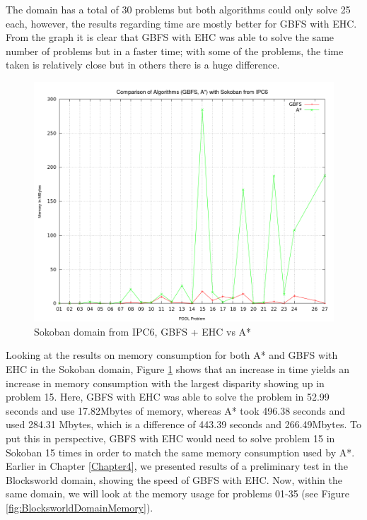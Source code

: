 The domain has a total of 30 problems but both algorithms could only solve 25 each, however, the results regarding time are mostly better for GBFS with EHC.  From the graph it is clear that GBFS with EHC was able to solve the same number of problems but in a faster time; with some of the problems, the time taken is relatively close but in others there is a huge difference.    
\\
\begin{figure}[!htb]
    \centering
    \includegraphics[scale=0.35]{SokobanMemory.png}
    \caption{Sokoban domain from IPC6, GBFS + EHC vs A* }
    \label{fig:SokobanDomainMemory}
\end{figure} 
Looking at the results on memory consumption for both A* and GBFS with EHC in the Sokoban domain, Figure \ref{fig:SokobanDomainMemory} shows that an increase in time yields an increase in memory consumption with the largest disparity showing up in problem 15. Here, GBFS with EHC was able to solve the problem in 52.99 seconds and use 17.82Mbytes of memory, whereas A* took 496.38 seconds and used 284.31 Mbytes, which is a difference of 443.39 seconds and 266.49Mbytes. To put this in perspective, GBFS with EHC would need to solve problem 15 in Sokoban 15 times in order to match the same memory consumption used by A*. 
Earlier in Chapter \ref{Chapter4}, we presented results of a preliminary test in the Blocksworld domain, showing the speed of GBFS with EHC.  Now, within the same domain, we will look at the memory usage for problems 01-35 (see Figure \ref{fig:BlocksworldDomainMemory}).
\\
